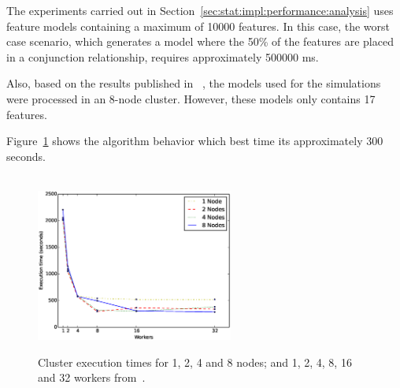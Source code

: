 The experiments carried out in Section~\ref{sec:stat:impl:performance:analysis}
uses feature models containing a maximum of 10000 features. In this case, 
the worst case scenario, which generates a model where the 50\% of the features are
placed in a conjunction relationship, requires approximately 500000 ms.

Also, based on the results published in \fodaPAc~\cite{clc16},
the models used for the simulations were processed in 
an 8-node cluster. However, these models only contains 17 features.

Figure~\ref{fig:cluster} shows the algorithm behavior 
which best time its approximately 300 seconds.

\begin{figure}[t]
	\centering
	\linefigure
	\\
	\includegraphics[width=0.7\hsize, height=5cm,angle=0]{plot_cluster.eps}
	\linefigure
	\caption{Cluster execution times for 1, 2, 4 and 8 nodes; and 1, 2, 4, 8, 16 and 32 workers  from~\cite{clc16}.}\label{fig:cluster}
\end{figure}

